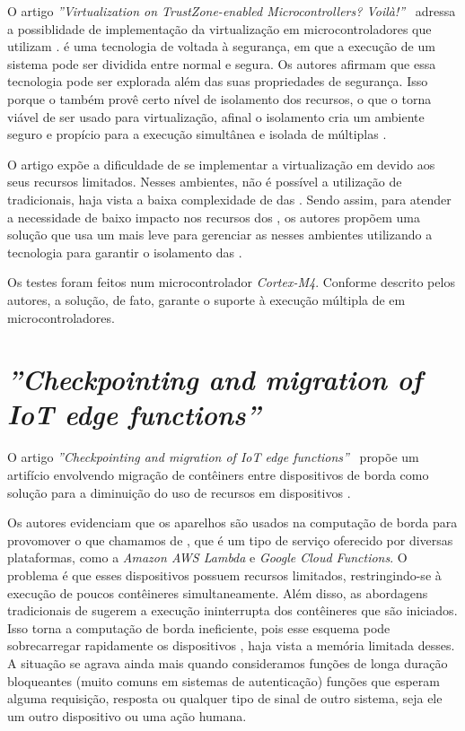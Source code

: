 O artigo \textit{''Virtualization on TrustZone-enabled Microcontrollers? Voilà!''}~\cite{pinto2019virtualization} adressa a possiblidade de implementação da virtualização em microcontroladores que utilizam \trustzone. \trustzone é uma tecnologia de \hardware voltada à segurança, em que a execução de um sistema pode ser dividida entre normal e segura. Os autores afirmam que essa tecnologia pode ser explorada além das suas propriedades de segurança. Isso porque o \trustzone também provê certo nível de isolamento dos recursos, o que o torna viável de ser usado para virtualização, afinal o isolamento cria um ambiente seguro e propício para a execução simultânea e isolada de múltiplas \vms.

O artigo expõe a dificuldade de se implementar a virtualização em \mcus devido aos seus recursos limitados. Nesses ambientes, não é possível a utilização de \hypervisors tradicionais, haja vista a baixa complexidade de \hardware das \mcus. Sendo assim, para atender a necessidade de baixo impacto nos recursos dos \mcus, os autores propõem uma solução que usa um \hypervisor mais leve para gerenciar as \vms nesses ambientes utilizando a tecnologia \trustzone para garantir o isolamento das \vms.

Os testes foram feitos num microcontrolador \textit{Cortex-M4}. Conforme descrito pelos autores, a solução, de fato, garante o suporte à execução múltipla de \vms em microcontroladores.

\section{\textit{''Checkpointing and migration of IoT edge functions''}}


O artigo \textit{''Checkpointing and migration of IoT edge functions''}~\cite{karhula2019checkpointing} propõe um artifício envolvendo migração de contêiners entre dispositivos \iot de borda como solução para a diminuição do uso de recursos em dispositivos \iot.

Os autores evidenciam que os aparelhos \iot são usados na computação de borda para provomover o que chamamos de \faas, que é um tipo de serviço oferecido por diversas plataformas, como a \textit{Amazon AWS Lambda} e \textit{Google Cloud Functions}. O problema é que esses dispositivos possuem recursos limitados, restringindo-se à execução de poucos contêineres simultaneamente. Além disso, as abordagens tradicionais de \faas sugerem a execução ininterrupta dos contêineres que são iniciados. Isso torna a computação de borda ineficiente, pois esse esquema pode sobrecarregar rapidamente os dispositivos \iot, haja vista a memória limitada desses. A situação se agrava ainda mais quando consideramos funções de longa duração bloqueantes (muito comuns em sistemas de autenticação) \eg funções que esperam alguma requisição, resposta ou qualquer tipo de sinal de outro sistema, seja ele um outro dispositivo \iot ou uma ação humana.

